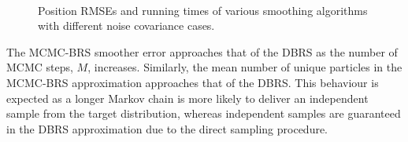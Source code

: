 \documentclass[10pt,twocolumn,twoside]{IEEEtran}
\begin{document}
\begin{figure}[!t]
\centering
{}
\\
\caption{Position RMSEs and running times of various smoothing algorithms with different noise covariance cases.}%
\label{fig:rmse_vs_time}%
\end{figure}

The MCMC-BRS smoother error approaches that of the DBRS as the number of MCMC steps, $M$, increases. Similarly, the mean number of unique particles in the MCMC-BRS approximation approaches that of the DBRS. This behaviour is expected as a longer Markov chain is more likely to deliver an independent sample from the target distribution, whereas independent samples are guaranteed in the DBRS approximation due to the direct sampling procedure.
\end{document}
